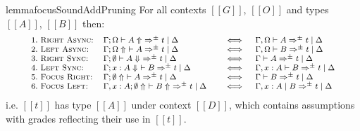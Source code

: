 \begin{restatable}{lemma}{focusSoundAddPruning}
\label{lemma:fAddPruningSynthSound}
For all contexts $[[ G ]]$, $[[ O ]]$ and types $[[ A ]]$, $[[ B ]]$
then:
\begin{align*}
  {\footnotesize{
\begin{array}{lll}
 1.\ \textsc{Right Async:} & \Gamma ; \Omega \vdash A \Uparrow\ \Rightarrow^{\pm} t \mid \Delta \quad &\iff \quad \Gamma, \Omega \vdash A \Rightarrow^{\pm} t \mid \Delta \\
 2.\ \textsc{Left Async:} & \Gamma ; \Omega \Uparrow\ \vdash A \Rightarrow^{\pm} t \mid \Delta \quad &\iff \quad \Gamma, \Omega \vdash B \Rightarrow^{\pm} t \mid \Delta \\
 3.\ \textsc{Right Sync:} & \Gamma ; \emptyset \vdash A \Downarrow\ \Rightarrow^{\pm} t \mid \Delta  \quad &\iff \quad \Gamma \vdash A \Rightarrow^{\pm} t \mid \Delta\\
 4.\ \textsc{Left Sync:} & \Gamma ; x : A \Downarrow\ \vdash  B \Rightarrow^{\pm} t \mid \Delta \quad &\iff \quad \Gamma, x : A \vdash B \Rightarrow^{\pm} t \mid \Delta \\
 5.\ \textsc{Focus Right:} & \Gamma ; \emptyset \Uparrow\ \vdash A \Rightarrow^{\pm} t \mid \Delta \quad &\iff \quad \Gamma \vdash B \Rightarrow^{\pm} t \mid \Delta \\
 6.\ \textsc{Focus Left:} & \Gamma, x : A ; \emptyset \Uparrow\ \vdash B \Uparrow\ \Rightarrow^{\pm} t \mid \Delta \quad &\iff \quad \Gamma, x : A \mid B \Rightarrow^{\pm} t \mid \Delta 
\end{array}
  }}
\end{align*}
i.e. $[[ t ]]$ has type $[[ A ]]$
under context $[[ D ]]$,
which contains assumptions with grades reflecting their use in $[[ t ]]$.
\end{restatable}


